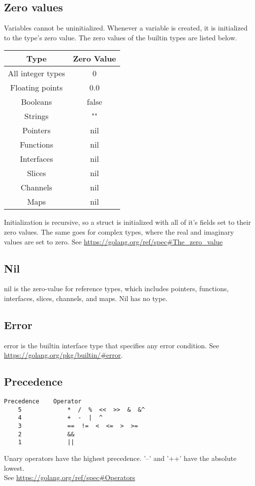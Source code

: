 \documentclass{article}
\begin{document}
	\subsection{Zero values}
		Variables cannot be uninitialized. Whenever a variable is created, it is initialized to the type's zero value. The zero values of the builtin types are listed below. 
		\begin{center}
			\begin{tabular}{ | c | c | }
			\hline
 			Type & Zero Value  \\ 
			\hline
 			All integer types & 0  \\  
 			Floating points & 0.0   \\
			Booleans & false \\
			Strings & "" \\
			Pointers & nil \\
			Functions & nil \\
			Interfaces & nil \\
			Slices & nil \\
			Channels & nil \\
			Maps & nil \\
			\hline
			\end{tabular}
		\end{center}
		Initialization is recursive, so a struct is initialized with all of it's fields set to their zero values. The same goes for complex types, where the real and imaginary values are set to zero.
		See \url{https://golang.org/ref/spec#The_zero_value}	
		
	\subsection{Nil}
	\colorbox{code}{nil} is the zero-value for reference types, which includes pointers, functions, interfaces, slices, channels, and maps. Nil has no type. 
		
	\subsection{Error}
	\colorbox{code}{error} is the builtin interface type that specifies any error condition. See \url{https://golang.org/pkg/builtin/#error}.
		
	\subsection{Precedence}
	\begin{verbatim}
Precedence    Operator
    5             *  /  %  <<  >>  &  &^
    4             +  -  |  ^
    3             ==  !=  <  <=  >  >=
    2             &&
    1             ||
	\end{verbatim}
	Unary operators have the highest precedence. '--' and '++' have the absolute lowest. \\
	See \url{https://golang.org/ref/spec#Operators}
\end{document}
